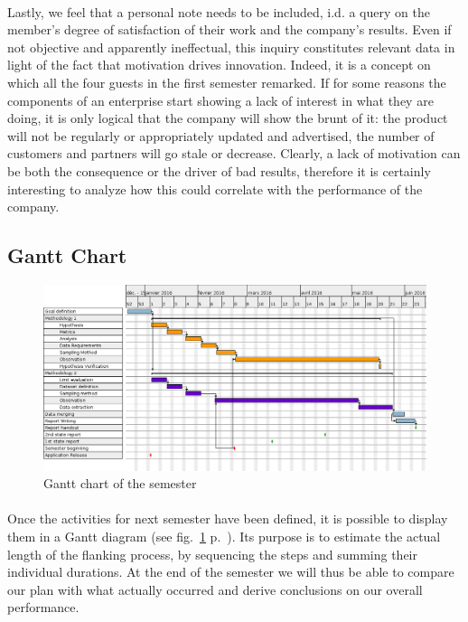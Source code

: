 \documentclass[twoside]{report}
\begin{document}
	\paragraph{}
	Lastly, we feel that a personal note needs to be included, i.d. a query on the member’s degree of satisfaction of their work and the company’s results. Even if not objective and apparently ineffectual, this inquiry constitutes relevant data in light of the fact that motivation drives innovation. Indeed, it is a concept on which all the four guests in the first semester remarked. If for some reasons the components of an enterprise start showing a lack of interest in what they are doing, it is only logical that the company will show the brunt of it: the product will not be regularly or appropriately updated and advertised, the number of customers and partners will go stale or decrease. Clearly, a lack of motivation can be both the consequence or the driver of bad results, therefore it is certainly interesting to analyze how this could correlate with the performance of the company.
	\subsection{Gantt Chart}
	\begin{landscape}
		\begin{figure}
			\begin{center}
				\includegraphics[width=1.5\textheight]{../Gantt/Planning.png}
				\caption{Gantt chart of the  semester}
				\label{fig:gantt}
			\end{center}
		\end{figure}
	\end{landscape}
	\paragraph{}
	Once the activities for next semester have been defined, it is possible to display them in a Gantt diagram (see fig.~\ref{fig:gantt} p.~\pageref{fig:gantt}). Its purpose is to estimate the actual length of the flanking process, by sequencing the steps and summing their individual durations. At the end of the semester we will thus be able to compare our plan with what actually occurred and derive conclusions on our overall performance.
\end{document}
